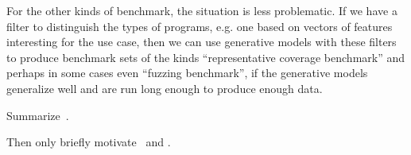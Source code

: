 For the other kinds of benchmark, the situation is less problematic.
If we have a filter to distinguish the types of programs, e.g. one based on vectors of features interesting for the use case, then we can use generative models with these filters to produce benchmark sets of the kinds ``representative coverage benchmark'' and perhaps in some cases even ``fuzzing benchmark'', if the generative models generalize well and are run long enough to produce enough data.


Summarize~\cite{goens_mapl19}.

Then only briefly motivate~\cite{brauckmann_cc20} and \cite{brauckmann_fdl20}.

